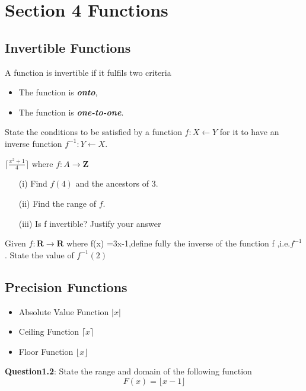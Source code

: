 \documentclass[12pt]{article} %
\begin{document}
\newpage

\section{Section 4 Functions}

\subsection{Invertible Functions}
A function is invertible if it fulfils two criteria
\begin{itemize}
\item The function is \textbf{\textit{onto}},
\item The function is \textbf{\textit{one-to-one}}.
\end{itemize}

State the conditions to be satisfied by a function
$f : X \leftarrow Y$ for it to have an inverse function
$f^{-1} : Y \leftarrow X$.

$\lceil \frac{x^2+1}{4} \rceil$
where $f : A \rightarrow \textbf{Z}$
\begin{itemize}
\item[(i)] Find $f(4)$ and the ancestors of 3.
\item[(ii)] Find the range of $f$.
\item[(iii)] Is f invertible? Justify your answer
\end{itemize}

Given $f : \textbf{R} \rightarrow \textbf{R}$ where f(x) =3x-1,define fully
the inverse of the function f ,i.e.$f^{-1}$. 
State the value of $f^{-1}(2)$
\subsection{Precision Functions}

\begin{itemize}
\item Absolute Value Function $| x |$
\item Ceiling Function $\lceil x \rceil$
\item Floor Function  $\lfloor x \rfloor $
\end{itemize}

\noindent \textbf{Question1.2}: State the range and domain of the following function
\[ F(x) = \lfloor x-1 \rfloor \]
\end{document}
